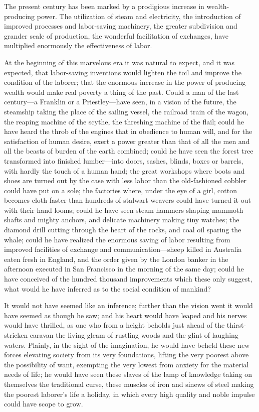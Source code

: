 The present century has been marked by a prodigious increase in
wealth-producing power. The utilization of steam and electricity, the
introduction of improved processes and labor-saving machinery, the
greater subdivision and grander scale of production, the wonderful
facilitation of exchanges, have multiplied enormously the effectiveness
of labor.

At the beginning of this marvelous era it was natural to expect, and it
was expected, that labor-saving inventions would lighten the toil and
improve the condition of the laborer; that the enormous increase in the
power of producing wealth would make real poverty a thing of the past.
Could a man of the last century---a Franklin or a Priestley---have seen,
in a vision of the future, the steamship taking the place of the sailing
vessel, the railroad train of the wagon, the reaping machine of the
scythe, the threshing machine of the flail; could he have heard the
throb of the engines that in obedience to human will, and for the
satisfaction of human desire, exert a power greater than that of all the
men and all the beasts of burden of the earth combined; could he have
seen the forest tree transformed into finished lumber---into doors,
sashes, blinds, boxes or barrels, with hardly the touch of a human hand;
the great workshops where boots and shoes are turned out by the case
with less labor than the old-fashioned cobbler could have put on a sole;
the factories where, under the eye of a girl, cotton becomes cloth
faster than hundreds of stalwart weavers could have turned it out with
their hand looms; could he have seen steam hammers shaping mammoth
shafts and mighty anchors, and delicate machinery making tiny watches;
the diamond drill cutting through the heart of the rocks, and coal oil
sparing the whale; could he have realized the enormous saving of labor
resulting from improved facilities of exchange and communication---sheep
killed in Australia eaten fresh in England, and the order given by the
London banker in the afternoon executed in San Francisco in the morning
of the same day; could he have conceived of the hundred thousand
improvements which these only suggest, what would he have inferred as to
the social condition of mankind?

It would not have seemed like an inference; further than the vision went
it would have seemed as though he saw; and his heart would have leaped
and his nerves would have thrilled, as one who from a height beholds
just ahead of the thirst-stricken caravan the living gleam of rustling
woods and the glint of laughing waters. Plainly, in the sight of the
imagination, he would have beheld these new forces elevating society
from its very foundations, lifting the very poorest above the
possibility of want, exempting the very lowest from anxiety for the
material needs of life; he would have seen these slaves of the lamp of
knowledge taking on themselves the traditional curse, these muscles of
iron and sinews of steel making the poorest laborer's life a holiday, in
which every high quality and noble impulse could have scope to grow.

